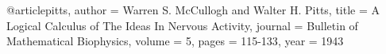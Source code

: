 @article{pitts, 
author = {Warren S. McCullogh and Walter H. Pitts},
title = {A Logical Calculus of The Ideas In Nervous Activity},
journal = {Bulletin of Mathematical Biophysics},
volume = {5}, 
pages = {115-133},
year = {1943}
}

